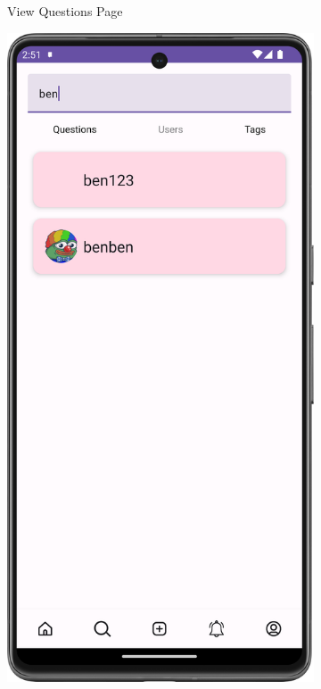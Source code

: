 \begin{figure}[H]
\begin{subfigure}[b]{0.3\textwidth}
    \caption{View Questions Page}
    \label{fig:view_questions_page}
  \end{subfigure}
  \hfill
  \begin{subfigure}[b]{0.3\textwidth}
    \includegraphics[width=\textwidth]{Figures/Product_Images/Questions_Answers/users_page.png}

\end{subfigure}
\end{figure}
